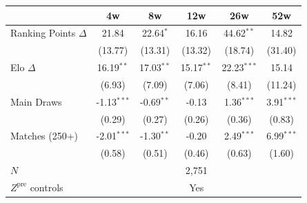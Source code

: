 \begin{tabular}{lccccc}
\toprule
 & 4w & 8w & 12w & 26w & 52w \\
\midrule
Ranking Points $\Delta$ & 21.84 & 22.64$^{*}$ & 16.16 & 44.62$^{**}$ & 14.82 \\
 & (13.77) & (13.31) & (13.32) & (18.74) & (31.40) \\[0.3em]
Elo $\Delta$ & 16.19$^{**}$ & 17.03$^{**}$ & 15.17$^{**}$ & 22.23$^{***}$ & 15.14 \\
 & (6.93) & (7.09) & (7.06) & (8.41) & (11.24) \\[0.3em]
Main Draws & -1.13$^{***}$ & -0.69$^{**}$ & -0.13 & 1.36$^{***}$ & 3.91$^{***}$ \\
 & (0.29) & (0.27) & (0.26) & (0.36) & (0.83) \\[0.3em]
Matches (250+) & -2.01$^{***}$ & -1.30$^{**}$ & -0.20 & 2.49$^{***}$ & 6.99$^{***}$ \\
 & (0.58) & (0.51) & (0.46) & (0.63) & (1.60) \\[0.3em]
\midrule
$N$ & \multicolumn{5}{c}{2,751} \\
$Z^{\text{pre}}$ controls & \multicolumn{5}{c}{Yes} \\
\bottomrule
\end{tabular}

